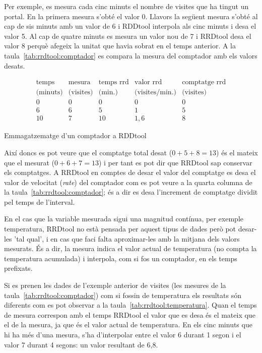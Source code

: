 Per exemple, es mesura cada cinc minuts el nombre de visites que ha tingut un portal. En la primera mesura s'obté el valor 0. Llavors la següent mesura s'obté al cap de sis minuts amb un valor de 6 i RDDtool interpola als cinc minuts i desa el valor 5. Al cap de quatre minuts es mesura un valor nou de 7 i RRDtool desa el valor 8 perquè afegeix la unitat que havia sobrat en el temps anterior. A la taula~\ref{tab:rrdtool:comptador} es compara la mesura del comptador amb els valors desats.


\begin{table}[h]
  \centering
\[
\begin{array}{cc||ccc}
\text{temps} & \text{mesura} & \text{temps rrd} & \text{valor rrd } &   \text{comptatge rrd} \\
\text{(minuts)} & \text{(visites)} & \text{(min.)} & \text{(visites/min.)} &   \text{(visites)}\\ \hline
0 & 0 & 0 & 0 & 0  \\
6 & 6 & 5 & 1 & 5\\
10& 7 & 10& 1,6 & 8 
\end{array}
\]
  \caption{Emmagatzematge d'un comptador a RDDtool}
  \label{tab:rrdtool:comptador}
\end{table}


Així doncs es pot veure que el comptatge total desat ($0+5+8=13$) és el mateix que el mesurat ($0+6+7=13$) i per tant es pot dir que RRDtool sap conservar els comptatges. A RRDtool en comptes de desar el valor del comptatge es desa el valor de velocitat (\emph{rate}) del comptador com es pot veure a la quarta columna de la  taula~\ref{tab:rrdtool:comptador}; és a dir es desa l'increment de comptatge dividit pel temps de l'interval.


En el cas que la variable mesurada sigui una magnitud contínua, per exemple temperatura, RRDtool no està pensada per aquest tipus de dades però pot desar-les 'tal qual', i en cas que faci falta aproximar-les amb la mitjana dels valors mesurats.  És a dir, la mesura indica el valor actual de temperatura (no compta la temperatura acumulada) i interpola, com si fos un comptador, en els temps prefixats. 

Si es prenen les dades de l'exemple anterior de visites (les mesures de la  taula~\ref{tab:rrdtool:comptador}) com si fossin de temperatura els resultats són diferents com es pot observar a la taula~\ref{tab:rrdtool:temperatura}. Quan el temps de mesura correspon amb el temps RRDtool el valor que es desa és el mateix que el de la mesura, ja que és el valor actual de temperatura. En els cinc minuts que hi ha més d'una mesura, s'ha d'interpolar entre el valor 6 durant 1 segon i el valor 7 durant 4 segons: un valor resultant de 6,8.

